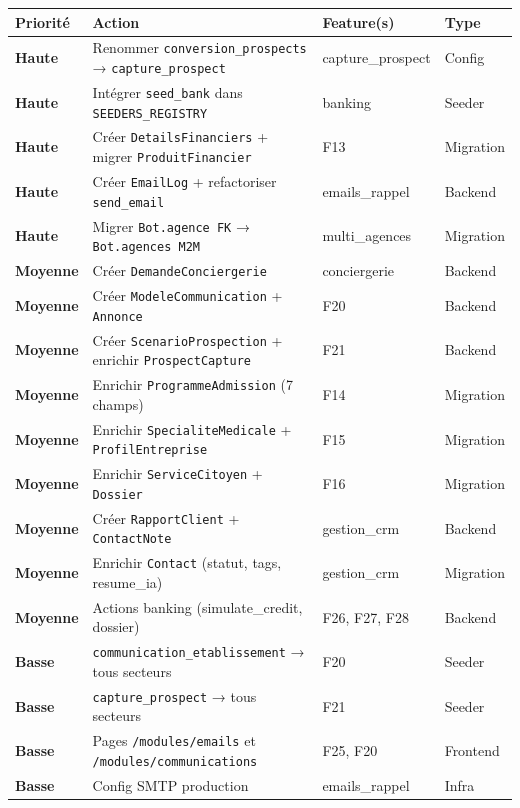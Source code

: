 \documentclass[11pt,a4paper]{article}
\newcommand{\slug}[1]{\texttt{\color{AGTDark}#1}}
\newcommand{\prio}[1]{\textcolor{AGTRed}{\textbf{#1}}}
\newcommand{\priom}[1]{\textcolor{AGTOrange}{\textbf{#1}}}
\newcommand{\priob}[1]{\textcolor{AGTGreen}{\textbf{#1}}}
\begin{document}
\begin{center}
\begin{longtable}{lp{7cm}p{3cm}l}
\toprule
\textbf{Priorité} & \textbf{Action} & \textbf{Feature(s)} & \textbf{Type} \\
\midrule
\endhead
\prio{Haute} & Renommer \slug{conversion\_prospects} → \slug{capture\_prospect} & capture\_prospect & Config \\[3pt]
\prio{Haute} & Intégrer \slug{seed\_bank} dans \slug{SEEDERS\_REGISTRY} & banking & Seeder \\[3pt]
\prio{Haute} & Créer \slug{DetailsFinanciers} + migrer \slug{ProduitFinancier} & F13 & Migration \\[3pt]
\prio{Haute} & Créer \slug{EmailLog} + refactoriser \slug{send\_email} & emails\_rappel & Backend \\[3pt]
\prio{Haute} & Migrer \slug{Bot.agence FK} → \slug{Bot.agences M2M} & multi\_agences & Migration \\[6pt]
\priom{Moyenne} & Créer \slug{DemandeConciergerie} & conciergerie & Backend \\[3pt]
\priom{Moyenne} & Créer \slug{ModeleCommunication} + \slug{Annonce} & F20 & Backend \\[3pt]
\priom{Moyenne} & Créer \slug{ScenarioProspection} + enrichir \slug{ProspectCapture} & F21 & Backend \\[3pt]
\priom{Moyenne} & Enrichir \slug{ProgrammeAdmission} (7 champs) & F14 & Migration \\[3pt]
\priom{Moyenne} & Enrichir \slug{SpecialiteMedicale} + \slug{ProfilEntreprise} & F15 & Migration \\[3pt]
\priom{Moyenne} & Enrichir \slug{ServiceCitoyen} + \slug{Dossier} & F16 & Migration \\[3pt]
\priom{Moyenne} & Créer \slug{RapportClient} + \slug{ContactNote} & gestion\_crm & Backend \\[3pt]
\priom{Moyenne} & Enrichir \slug{Contact} (statut, tags, resume\_ia) & gestion\_crm & Migration \\[3pt]
\priom{Moyenne} & Actions banking (simulate\_credit, dossier) & F26, F27, F28 & Backend \\[6pt]
\priob{Basse} & \slug{communication\_etablissement} → tous secteurs & F20 & Seeder \\[3pt]
\priob{Basse} & \slug{capture\_prospect} → tous secteurs & F21 & Seeder \\[3pt]
\priob{Basse} & Pages \texttt{/modules/emails} et \texttt{/modules/communications} & F25, F20 & Frontend \\[3pt]
\priob{Basse} & Config SMTP production & emails\_rappel & Infra \\
\bottomrule
\end{longtable}
\end{center}
\end{document}

